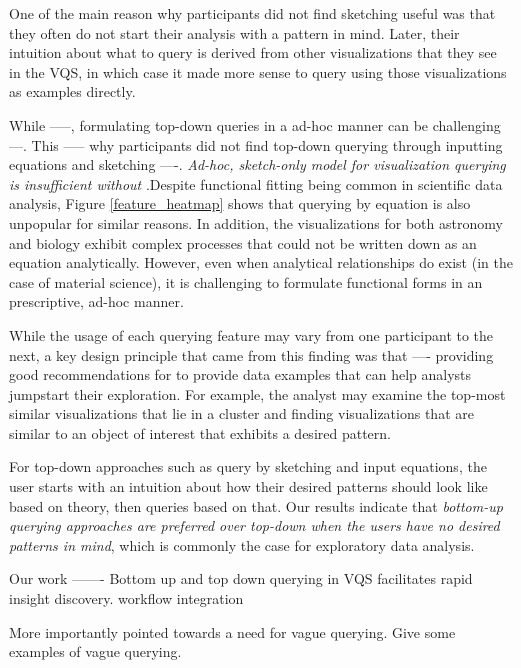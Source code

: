 \par One of the main reason why participants did not find sketching useful was that they often do not start their analysis with a pattern in mind. Later, their intuition about what to query is derived from other visualizations that they see in the VQS, in which case it made more sense to query using those visualizations as examples directly. 
\par While -----, formulating top-down queries in a ad-hoc manner can be challenging ---. This ----- why participants did not find top-down querying through inputting equations and sketching ----. \emph{Ad-hoc, sketch-only model for visualization querying is insufficient without }.Despite functional fitting being common in scientific data analysis, Figure \ref{feature_heatmap} shows that querying by equation is also unpopular for similar reasons. In addition, the visualizations for both astronomy and biology exhibit complex processes that could not be written down as an equation analytically. However, even when analytical relationships do exist (in the case of material science), it is challenging to formulate functional forms in an prescriptive, ad-hoc manner. 

While the usage of each querying feature may vary from one participant to the next, a key design principle that came from this finding was that ---- providing good recommendations for to provide data examples that can help analysts jumpstart their exploration. For example, the analyst may examine the top-most similar visualizations that lie in a cluster and finding visualizations that are similar to an object of interest that exhibits a desired pattern. 

For top-down approaches such as query by sketching and input equations, the user starts with an intuition about how their desired patterns should look like based on theory, then queries based on that. Our results indicate that \emph{bottom-up querying approaches are preferred over top-down when the users have no desired patterns in mind}, which is commonly the case for exploratory data analysis.

\par Our \zv work ------- Bottom up and top down querying in VQS facilitates rapid insight discovery. 
workflow integration 

More importantly pointed towards a need for vague querying. Give some examples of vague querying.

